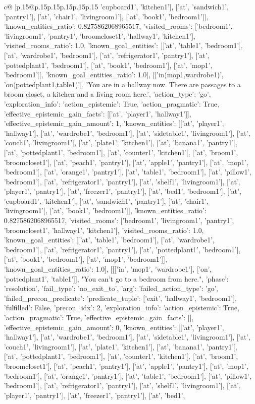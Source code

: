 \documentclass{article}
\begin{document}
{\begin{supertabular}{c@{$\;$}|p{.15\linewidth}@{}p{.15\linewidth}p{.15\linewidth}p{.15\linewidth}p{.15\linewidth}p{.15\linewidth}}
{{{'cupboard1', 'kitchen1'], ['at', 'sandwich1', 'pantry1'], ['at', 'chair1', 'livingroom1'], ['at', 'book1', 'bedroom1']], 'known_entities_ratio': 0.8275862068965517, 'visited_rooms': ['bedroom1', 'livingroom1', 'pantry1', 'broomcloset1', 'hallway1', 'kitchen1'], 'visited_rooms_ratio': 1.0, 'known_goal_entities': [['at', 'table1', 'bedroom1'], ['at', 'wardrobe1', 'bedroom1'], ['at', 'refrigerator1', 'pantry1'], ['at', 'pottedplant1', 'bedroom1'], ['at', 'book1', 'bedroom1'], ['at', 'mop1', 'bedroom1']], 'known_goal_entities_ratio': 1.0}}], [['in(mop1,wardrobe1)', 'on(pottedplant1,table1)'], 'You are in a hallway now. There are passages to a broom closet, a kitchen and a living room here.', {'action_type': 'go', 'exploration_info': {'action_epistemic': True, 'action_pragmatic': True, 'effective_epistemic_gain_facts': [['at', 'player1', 'hallway1']], 'effective_epistemic_gain_amount': 1, 'known_entities': [['at', 'player1', 'hallway1'], ['at', 'wardrobe1', 'bedroom1'], ['at', 'sidetable1', 'livingroom1'], ['at', 'couch1', 'livingroom1'], ['at', 'plate1', 'kitchen1'], ['at', 'banana1', 'pantry1'], ['at', 'pottedplant1', 'bedroom1'], ['at', 'counter1', 'kitchen1'], ['at', 'broom1', 'broomcloset1'], ['at', 'peach1', 'pantry1'], ['at', 'apple1', 'pantry1'], ['at', 'mop1', 'bedroom1'], ['at', 'orange1', 'pantry1'], ['at', 'table1', 'bedroom1'], ['at', 'pillow1', 'bedroom1'], ['at', 'refrigerator1', 'pantry1'], ['at', 'shelf1', 'livingroom1'], ['at', 'player1', 'pantry1'], ['at', 'freezer1', 'pantry1'], ['at', 'bed1', 'bedroom1'], ['at', 'cupboard1', 'kitchen1'], ['at', 'sandwich1', 'pantry1'], ['at', 'chair1', 'livingroom1'], ['at', 'book1', 'bedroom1']], 'known_entities_ratio': 0.8275862068965517, 'visited_rooms': ['bedroom1', 'livingroom1', 'pantry1', 'broomcloset1', 'hallway1', 'kitchen1'], 'visited_rooms_ratio': 1.0, 'known_goal_entities': [['at', 'table1', 'bedroom1'], ['at', 'wardrobe1', 'bedroom1'], ['at', 'refrigerator1', 'pantry1'], ['at', 'pottedplant1', 'bedroom1'], ['at', 'book1', 'bedroom1'], ['at', 'mop1', 'bedroom1']], 'known_goal_entities_ratio': 1.0}}], [[['in', 'mop1', 'wardrobe1'], ['on', 'pottedplant1', 'table1']], "You can't go to a bedroom from here.", {'phase': 'resolution', 'fail_type': 'no_exit_to', 'arg': {'failed_action_type': 'go', 'failed_precon_predicate': {'predicate_tuple': ['exit', 'hallway1', 'bedroom1'], 'fulfilled': False, 'precon_idx': 2}}, 'exploration_info': {'action_epistemic': True, 'action_pragmatic': True, 'effective_epistemic_gain_facts': [], 'effective_epistemic_gain_amount': 0, 'known_entities': [['at', 'player1', 'hallway1'], ['at', 'wardrobe1', 'bedroom1'], ['at', 'sidetable1', 'livingroom1'], ['at', 'couch1', 'livingroom1'], ['at', 'plate1', 'kitchen1'], ['at', 'banana1', 'pantry1'], ['at', 'pottedplant1', 'bedroom1'], ['at', 'counter1', 'kitchen1'], ['at', 'broom1', 'broomcloset1'], ['at', 'peach1', 'pantry1'], ['at', 'apple1', 'pantry1'], ['at', 'mop1', 'bedroom1'], ['at', 'orange1', 'pantry1'], ['at', 'table1', 'bedroom1'], ['at', 'pillow1', 'bedroom1'], ['at', 'refrigerator1', 'pantry1'], ['at', 'shelf1', 'livingroom1'], ['at', 'player1', 'pantry1'], ['at', 'freezer1', 'pantry1'], ['at', 'bed1', }}}
\end{supertabular}}
\end{document}
